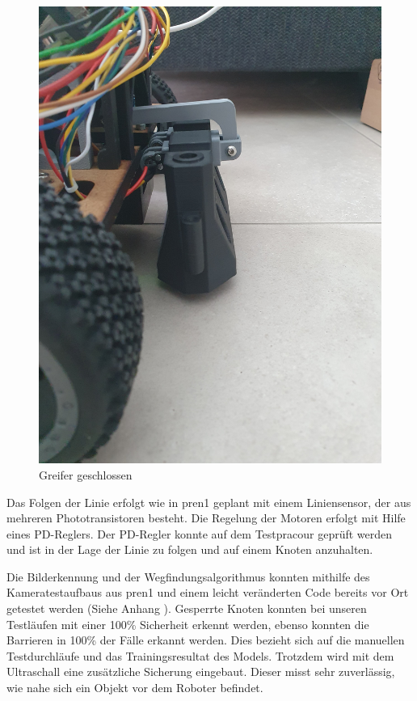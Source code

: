 \begin{figure}[H]
\begin{minipage}[b]{0.49\textwidth}
  \includegraphics[width=\textwidth, angle=-90]{assets/MT/greifer-close.jpg}
  \caption{Greifer geschlossen}
  \label{fig:griefe-rclose}
\end{minipage}
\end{figure}

Das Folgen der Linie erfolgt wie in \acrshort{pren1} geplant mit einem Liniensensor, der aus mehreren Phototransistoren besteht. Die Regelung der Motoren erfolgt mit Hilfe eines PD-Reglers. Der PD-Regler konnte auf dem Testpracour geprüft werden und ist in der Lage der Linie zu folgen und auf einem Knoten anzuhalten.

Die Bilderkennung und der Wegfindungsalgorithmus  konnten mithilfe des Kameratestaufbaus aus \acrshort{pren1} und einem leicht veränderten Code bereits vor Ort getestet werden (Siehe Anhang ). Gesperrte Knoten konnten bei unseren Testläufen mit einer 100\% Sicherheit erkennt werden, ebenso konnten die Barrieren in 100\% der Fälle erkannt werden. Dies bezieht sich auf die manuellen Testdurchläufe und das Trainingsresultat des Models. Trotzdem wird mit dem Ultraschall eine zusätzliche Sicherung eingebaut. Dieser misst sehr zuverlässig, wie nahe sich ein Objekt vor dem Roboter befindet.


